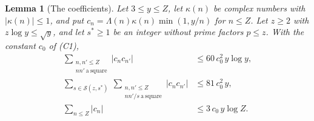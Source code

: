 \documentclass[11pt,letterpaper]{article}
\newtheorem{lemma}[theorem]{Lemma}
\numberwithin{equation}{section}
\begin{document}
\begin{lemma}[The coefficients]\label{coef}
Let $3\le y\le Z$, let $\kappa(n)$ be complex numbers with $|\kappa(n)|\le1$, and put $c_n=\Lambda(n)\kappa(n)\min(1,y/n)$ for $n\le Z$. Let $z\ge2$ with $z\log y\le\sqrt y$, and let $s^\ast\ge1$ be an integer without prime factors $p\le z$. With the constant $c_0$ of \textup{(C1)},
\begin{align*}
\sum_{\substack{n,n'\le Z\\ nn'\ \mathrm{a\ square}}}|c_nc_{n'}|&\le60\,c_0^2\,y\log y,\\
\sum_{s\in\mathcal S(z,s^\ast)}\ \sum_{\substack{n,n'\le Z\\ nn'/s\ \mathrm{a\ square}}}|c_nc_{n'}|&\le81\,c_0^2\,y,\\
\sum_{n\le Z}|c_n|&\le3\,c_0\,y\log Z .
\end{align*}
\end{lemma}
\end{document}
